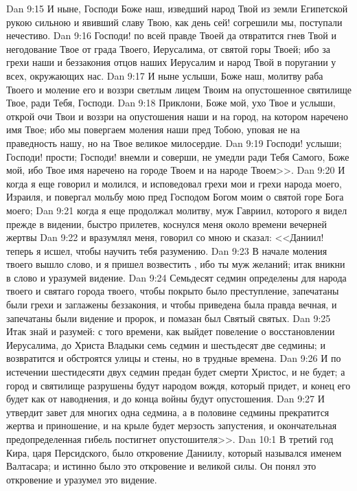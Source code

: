 \vs Dan 9:15 И ныне, Господи Боже наш, изведший народ Твой из земли Египетской рукою сильною и явивший славу Твою, как день сей! согрешили мы, поступали нечестиво.
\vs Dan 9:16 Господи! по всей правде Твоей да отвратится гнев Твой и негодование Твое от града Твоего, Иерусалима, от святой горы Твоей; ибо за грехи наши и беззакония отцов наших Иерусалим и народ Твой в поругании у всех, окружающих нас.
\vs Dan 9:17 И ныне услыши, Боже наш, молитву раба Твоего и моление его и воззри светлым лицем Твоим на опустошенное святилище Твое, ради Тебя, Господи.
\vs Dan 9:18 Приклони, Боже мой, ухо Твое и услыши, открой очи Твои и воззри на опустошения наши и на город, на котором наречено имя Твое; ибо мы повергаем моления наши пред Тобою, уповая не на праведность нашу, но на Твое великое милосердие.
\vs Dan 9:19 Господи! услыши; Господи! прости; Господи! внемли и соверши, не умедли ради Тебя Самого, Боже мой, ибо Твое имя наречено на городе Твоем и на народе Твоем>>.
\vs Dan 9:20 И когда я еще говорил и молился, и исповедовал грехи мои и грехи народа моего, Израиля, и повергал мольбу мою пред Господом Богом моим о святой горе Бога моего;
\vs Dan 9:21 когда я еще продолжал молитву, муж Гавриил, которого я видел прежде в видении, быстро прилетев, коснулся меня около времени вечерней жертвы
\vs Dan 9:22 и вразумлял меня, говорил со мною и сказал: <<Даниил! теперь я исшел, чтобы научить тебя разумению.
\vs Dan 9:23 В начале моления твоего вышло слово, и я пришел возвестить , ибо ты муж желаний; итак вникни в слово и уразумей видение.
\vs Dan 9:24 Семьдесят седмин определены для народа твоего и святаго города твоего, чтобы покрыто было преступление, запечатаны были грехи и заглажены беззакония, и чтобы приведена была правда вечная, и запечатаны были видение и пророк, и помазан был Святый святых.
\vs Dan 9:25 Итак знай и разумей: с того времени, как выйдет повеление о восстановлении Иерусалима, до Христа Владыки семь седмин и шестьдесят две седмины; и возвратится  и обстроятся улицы и стены, но в трудные времена.
\vs Dan 9:26 И по истечении шестидесяти двух седмин предан будет смерти Христос, и не будет; а город и святилище разрушены будут народом вождя, который придет, и конец его будет как от наводнения, и до конца войны будут опустошения.
\vs Dan 9:27 И утвердит завет для многих одна седмина, а в половине седмины прекратится жертва и приношение, и на крыле  будет мерзость запустения, и окончательная предопределенная гибель постигнет опустошителя>>.
\vs Dan 10:1 В третий год Кира, царя Персидского, было откровение Даниилу, который назывался именем Валтасара; и истинно было это откровение и великой силы. Он понял это откровение и уразумел это видение.
